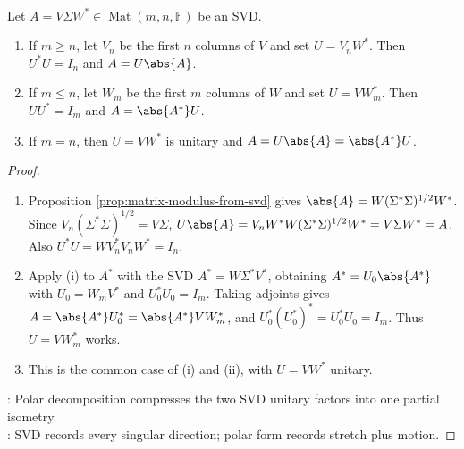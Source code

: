 \begin{theorem} \label{thm:rectangular-polar-decomposition} \\
Let $A=V\Sigma W^*\in\operatorname{Mat}(m,n,\mathbb{F})$ be an SVD.
\begin{enumerate}[label=(\roman*)]
\setlength{\itemsep}{0pt}
\item If $m\geq n$, let $V_n$ be the first $n$ columns of $V$ and set $U=V_nW^*$. Then $U^*U=I_n$ and $A=U\abs{A}$.
\item If $m\leq n$, let $W_m$ be the first $m$ columns of $W$ and set $U=VW_m^*$. Then $UU^*=I_m$ and $A=\abs{A^*}U$.
\item If $m=n$, then $U=VW^*$ is unitary and $A=U\abs{A}=\abs{A^*}U$.
\end{enumerate}
\begin{proof}
\begin{enumerate}[label=(\roman*)]
\setlength{\itemsep}{0pt}
\item Proposition \ref{prop:matrix-modulus-from-svd} gives $\abs{A}=W(\Sigma^*\Sigma)^{1/2}W^*$.\\
Since $V_n(\Sigma^*\Sigma)^{1/2}=V\Sigma$, $U\abs{A}=V_nW^*W(\Sigma^*\Sigma)^{1/2}W^*=V\Sigma W^*=A$. Also $U^*U=WV_n^*V_nW^*=I_n$.
\item Apply (i) to $A^*$ with the SVD $A^*=W\Sigma^*V^*$, obtaining $A^*=U_0\abs{A^*}$ with $U_0=W_mV^*$ and $U_0^*U_0=I_m$. Taking adjoints gives $A=\abs{A^*}U_0^*=\abs{A^*}VW_m^*$, and $U_0^*(U_0^*)^*=U_0^*U_0=I_m$. Thus $U=VW_m^*$ works.
\item This is the common case of (i) and (ii), with $U=VW^*$ unitary.
\end{enumerate}
: Polar decomposition compresses the two SVD unitary factors into one partial isometry.\\
: SVD records every singular direction; polar form records stretch plus motion.
\end{proof}
\end{theorem}


